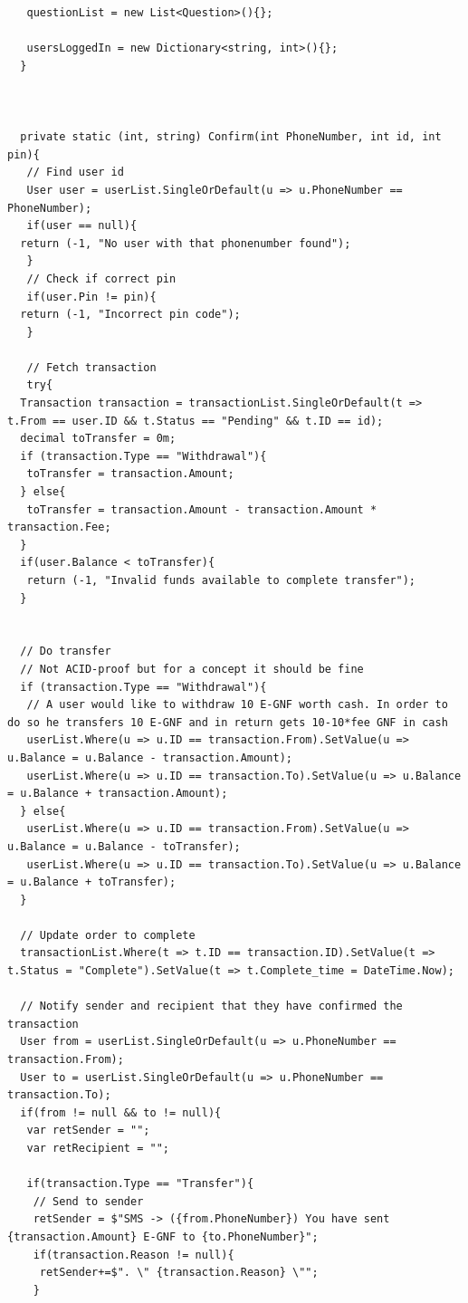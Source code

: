 \documentclass[11pt, a4paper]{article}
\begin{document}
\begin{appendices}
\begin{lstlisting}
   questionList = new List<Question>(){};

   usersLoggedIn = new Dictionary<string, int>(){};
  }



  private static (int, string) Confirm(int PhoneNumber, int id, int pin){
   // Find user id
   User user = userList.SingleOrDefault(u => u.PhoneNumber == PhoneNumber);
   if(user == null){
  return (-1, "No user with that phonenumber found");
   }
   // Check if correct pin
   if(user.Pin != pin){
  return (-1, "Incorrect pin code");
   }

   // Fetch transaction
   try{
  Transaction transaction = transactionList.SingleOrDefault(t => t.From == user.ID && t.Status == "Pending" && t.ID == id);
  decimal toTransfer = 0m;
  if (transaction.Type == "Withdrawal"){
   toTransfer = transaction.Amount;
  } else{
   toTransfer = transaction.Amount - transaction.Amount * transaction.Fee;
  }
  if(user.Balance < toTransfer){
   return (-1, "Invalid funds available to complete transfer");
  }


  // Do transfer
  // Not ACID-proof but for a concept it should be fine
  if (transaction.Type == "Withdrawal"){
   // A user would like to withdraw 10 E-GNF worth cash. In order to do so he transfers 10 E-GNF and in return gets 10-10*fee GNF in cash
   userList.Where(u => u.ID == transaction.From).SetValue(u => u.Balance = u.Balance - transaction.Amount);
   userList.Where(u => u.ID == transaction.To).SetValue(u => u.Balance = u.Balance + transaction.Amount);
  } else{
   userList.Where(u => u.ID == transaction.From).SetValue(u => u.Balance = u.Balance - toTransfer);
   userList.Where(u => u.ID == transaction.To).SetValue(u => u.Balance = u.Balance + toTransfer);
  }

  // Update order to complete
  transactionList.Where(t => t.ID == transaction.ID).SetValue(t => t.Status = "Complete").SetValue(t => t.Complete_time = DateTime.Now);

  // Notify sender and recipient that they have confirmed the transaction
  User from = userList.SingleOrDefault(u => u.PhoneNumber == transaction.From);
  User to = userList.SingleOrDefault(u => u.PhoneNumber == transaction.To);
  if(from != null && to != null){
   var retSender = "";
   var retRecipient = "";

   if(transaction.Type == "Transfer"){
    // Send to sender
    retSender = $"SMS -> ({from.PhoneNumber}) You have sent {transaction.Amount} E-GNF to {to.PhoneNumber}";
    if(transaction.Reason != null){
     retSender+=$". \" {transaction.Reason} \"";
    }


\end{lstlisting}
\end{appendices}
\end{document}
